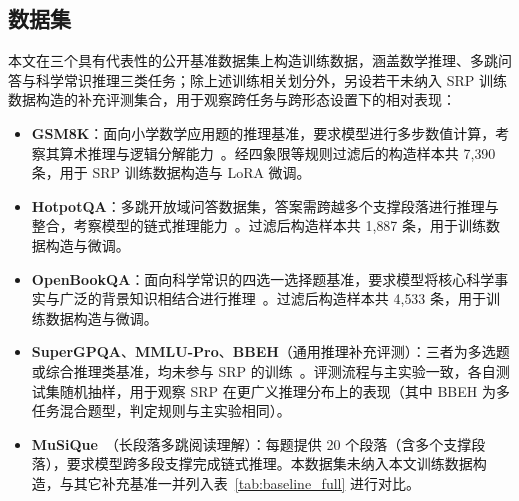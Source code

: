 \subsection{数据集}

本文在三个具有代表性的公开基准数据集上构造训练数据，涵盖数学推理、多跳问答与科学常识推理三类任务；除上述训练相关划分外，另设若干未纳入 SRP 训练数据构造的补充评测集合，用于观察跨任务与跨形态设置下的相对表现：

\begin{itemize}
    \item \textbf{GSM8K}：面向小学数学应用题的推理基准，要求模型进行多步数值计算，考察其算术推理与逻辑分解能力~\cite{cobbe2021gsm8k}。经四象限等规则过滤后的构造样本共 7{,}390 条，用于 SRP 训练数据构造与 LoRA 微调。
    \item \textbf{HotpotQA}：多跳开放域问答数据集，答案需跨越多个支撑段落进行推理与整合，考察模型的链式推理能力~\cite{yang2018hotpotqa}。过滤后构造样本共 1{,}887 条，用于训练数据构造与微调。
    \item \textbf{OpenBookQA}：面向科学常识的四选一选择题基准，要求模型将核心科学事实与广泛的背景知识相结合进行推理~\cite{mihaylov2018openbookqa}。过滤后构造样本共 4{,}533 条，用于训练数据构造与微调。
    \item \textbf{SuperGPQA}、\textbf{MMLU-Pro}、\textbf{BBEH}（通用推理补充评测）：三者为多选题或综合推理类基准，均未参与 SRP 的训练~\cite{supergpqa2025,wang2024mmlupro,kazemi2025bbeh}。评测流程与主实验一致，各自测试集随机抽样，用于观察 SRP 在更广义推理分布上的表现（其中 BBEH 为多任务混合题型，判定规则与主实验相同）。
    \item \textbf{MuSiQue}~\cite{trivedi-etal-2022-musique}（长段落多跳阅读理解）：每题提供 20 个段落（含多个支撑段落），要求模型跨多段支撑完成链式推理。本数据集未纳入本文训练数据构造，与其它补充基准一并列入表~\ref{tab:baseline_full} 进行对比。
\end{itemize}

